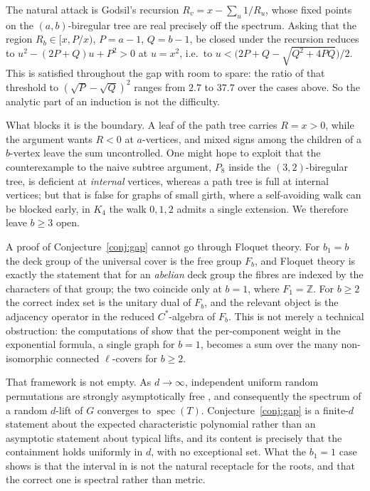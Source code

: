 \documentclass[11pt]{article}
\theoremstyle{remark}
\begin{document}
The natural attack is Godsil's recursion $R_v=x-\sum_{u}1/R_u$, whose fixed
points on the $(a,b)$-biregular tree are real precisely off the spectrum. Asking
that the region $R_b\in[x,P/x)$, $P=a-1$, $Q=b-1$, be closed under the
recursion reduces to $u^2-(2P+Q)u+P^2>0$ at $u=x^2$, i.e.\ to
$u<\bigl(2P+Q-\sqrt{Q^2+4PQ}\bigr)/2$. This is satisfied throughout the gap
with room to spare: the ratio of that threshold to $(\sqrt P-\sqrt Q)^2$ ranges
from $2.7$ to $37.7$ over the cases above. So the analytic part of an induction
is not the difficulty.

What blocks it is the boundary. A leaf of the path tree carries $R=x>0$, while
the argument wants $R<0$ at $a$-vertices, and mixed signs among the children of
a $b$-vertex leave the sum uncontrolled. One might hope to exploit that the
counterexample to the naive subtree argument, $P_8$ inside the $(3,2)$-biregular
tree, is deficient at \emph{internal} vertices, whereas a path tree is full at
internal vertices; but that is false for graphs of small girth, where a
self-avoiding walk can be blocked early, in $K_4$ the walk $0,1,2$ admits a
single extension. We therefore leave $b\ge3$ open.

A proof of Conjecture~\ref{conj:gap} cannot go through Floquet theory. For
$b_1=b$ the deck group of the universal cover is the free group $F_b$, and
Floquet theory is exactly the statement that for an \emph{abelian} deck group
the fibres are indexed by the characters of that group; the two coincide only
at $b=1$, where $F_1=\mathbb{Z}$. For $b\ge2$ the correct index set is the
unitary dual of $F_b$, and the relevant object is the adjacency operator in the
reduced $C^*$-algebra of $F_b$. This is not merely a technical obstruction: the
computations of \cite{PartI} show that the per-component weight in the
exponential formula, a single graph for $b=1$, becomes a sum over the many
non-isomorphic connected $\ell$-covers for $b\ge2$.

That framework is not empty. As $d\to\infty$, independent uniform random
permutations are strongly asymptotically free \cite{BC}, and consequently the
spectrum of a random $d$-lift of $G$ converges to $\operatorname{spec}(T)$.
Conjecture~\ref{conj:gap} is a finite-$d$ statement about the expected
characteristic polynomial rather than an asymptotic statement about typical
lifts, and its content is precisely that the containment holds uniformly in
$d$, with no exceptional set. What the $b_1=1$ case shows is that the interval
in \cite{HPS} is not the natural receptacle for the roots, and that the correct
one is spectral rather than metric.
\end{document}
